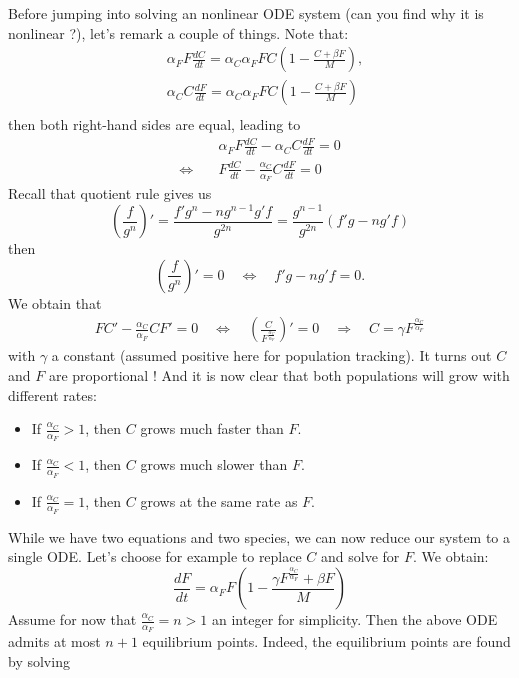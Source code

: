Before jumping into solving an nonlinear ODE system (can you find why it is nonlinear ?), let's remark a couple of things. Note that:
\[
 \begin{aligned}
&\displaystyle \alpha_F F \frac{dC}{dt} = \alpha_C\alpha_F F C \left( 1 - \frac{C + \beta F}{M} \right)  ,\\
&\displaystyle  \alpha_C  C \frac{dF}{dt} =  \alpha_C\alpha_F F C \left( 1 - \frac{C + \beta F}{M} \right)  \\
\end{aligned}
\]
then both right-hand sides are equal, leading to
\[
 \begin{aligned}
 & \displaystyle \alpha_F F \frac{dC}{dt} -  \alpha_C  C \frac{dF}{dt} = 0\\
 \Longleftrightarrow \quad &  \displaystyle F \frac{dC}{dt} -  \frac{\alpha_C}{ \alpha_F}  C \frac{dF}{dt} = 0
\end{aligned} 
 \]
 Recall that quotient rule gives us
 \[ \left( \frac{f}{g^n} \right)' = \displaystyle \frac{f' g^n - n g^{n-1} g' f}{g^{2n}} = \frac{g^{n-1}}{g^{2n}} \left( f' g - n g'f \right)
 \]
then 
\[ \left( \frac{f}{g^n} \right)' = 0 \quad \Longleftrightarrow \quad  f' g - n g'f  = 0.\]
We obtain that
\[
 \begin{aligned}
  \displaystyle F C'-  \frac{\alpha_C}{ \alpha_F}  C F' = 0 \quad \Longleftrightarrow \quad \left( \frac{C}{F^{\frac{\alpha_C}{ \alpha_F} }} \right)' = 0 \quad  \Longrightarrow \quad  {C} = \gamma  F^{\frac{\alpha_C}{ \alpha_F} }
\end{aligned} 
 \]
with $\gamma$ a constant (assumed positive here for population tracking). It turns out $C$ and $F$ are proportional ! And it is now clear that both populations will grow with different rates:
\begin{itemize}
\item If $\frac{\alpha_C}{ \alpha_F}  > 1$, then $C$ grows much faster than $F$.
\item If $\frac{\alpha_C}{ \alpha_F}  < 1$, then $C$ grows much slower than $F$.
\item If $\frac{\alpha_C}{ \alpha_F}  = 1$, then $C$ grows at the same rate as $F$.
\end{itemize}
While we have two equations and two species, we can now reduce our system to a single ODE. Let's choose for example to replace $C$ and solve for $F$. We obtain:
\[\displaystyle  \frac{dF}{dt} =  \alpha_F F  \left( 1 - \frac{ \gamma  F^{\frac{\alpha_C}{ \alpha_F} } + \beta F}{M} \right) 
\]
Assume for now that $\frac{\alpha_C}{ \alpha_F}  = n >1$ an integer for simplicity. Then the above ODE admits at most $n+1$ equilibrium points. Indeed, the equilibrium points are found by solving
